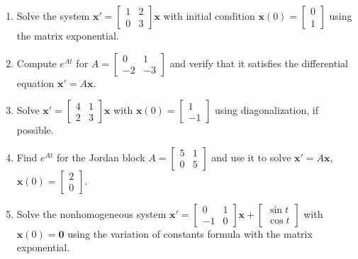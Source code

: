       \begin{question}
        \begin{enumerate}
          \item Solve the system $\mathbf{x}' = \begin{bmatrix} 1 & 2 \\ 0 & 3 \end{bmatrix} \mathbf{x}$ with initial condition $\mathbf{x}(0) = \begin{bmatrix} 0 \\ 1 \end{bmatrix}$ using the matrix exponential.

          \item Compute $e^{At}$ for $A = \begin{bmatrix} 0 & 1 \\ -2 & -3 \end{bmatrix}$ and verify that it satisfies the differential equation $\mathbf{x}' = A \mathbf{x}$.

          \item Solve $\mathbf{x}' = \begin{bmatrix} 4 & 1 \\ 2 & 3 \end{bmatrix} \mathbf{x}$ with $\mathbf{x}(0) = \begin{bmatrix} 1 \\ -1 \end{bmatrix}$ using diagonalization, if possible.

          \item Find $e^{At}$ for the Jordan block $A = \begin{bmatrix} 5 & 1 \\ 0 & 5 \end{bmatrix}$ and use it to solve $\mathbf{x}' = A \mathbf{x}$, $\mathbf{x}(0) = \begin{bmatrix} 2 \\ 0 \end{bmatrix}$.

          \item Solve the nonhomogeneous system $\mathbf{x}' = \begin{bmatrix} 0 & 1 \\ -1 & 0 \end{bmatrix} \mathbf{x} + \begin{bmatrix} \sin t \\ \cos t \end{bmatrix}$ with $\mathbf{x}(0) = \mathbf{0}$ using the variation of constants formula with the matrix exponential.


\end{enumerate}
\end{question}
